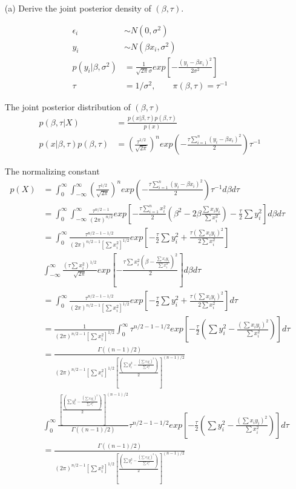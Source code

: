 \documentclass[11pt]{article} %
\begin{document}
\begin{itemize}
	\item [(a)] Derive the joint posterior density of $(\beta, \tau)$.
	
	\begin{align*}
		\epsilon_i & \sim N(0, \sigma^2) \\
		y_i & \sim N(\beta x_i, \sigma^2) \\
		p(y_i|\beta, \sigma^2) &= \frac{1}{\sqrt{2\pi} \sigma} exp[-\frac{(y_i-\beta x_i)^2}{2\sigma^2}] \\
		\tau &= 1/\sigma^2, \qquad \pi(\beta, \tau) = \tau^{-1}
	\end{align*}	
	
	The joint posterior distribution of $(\beta, \tau)$ 
\begin{align*}
	p(\beta, \tau|X) &= \frac{p(x|\beta, \tau) p(\beta, \tau)}{p(x)} \\
	p(x|\beta, \tau) p(\beta, \tau) &= (\frac{\tau^{1/2}}{\sqrt{2\pi}})^n exp(-\frac{\tau \sum_{i=1}^n (y_i-\beta x_i)^2}{2}) \tau^{-1}
\end{align*}	

	The normalizing constant
		\begin{align*}
		p(X) &= \int_{0}^{\infty} \int_{-\infty}^{\infty} (\frac{\tau^{1/2}}{\sqrt{2\pi}})^n exp(-\frac{\tau \sum_{i=1}^n (y_i-\beta x_i)^2}{2}) \tau^{-1} d\beta d\tau \\
		&=  \int_{0}^{\infty} \int_{-\infty}^{\infty} \frac{\tau^{n/2-1}}{(2\pi)^{n/2}} exp[-\frac{\tau \sum_{i=1}^n x_i^2}{2} (\beta^2 -2 \beta \frac{\sum x_i y_i}{\sum x_i^2} ) - \frac{\tau}{2} \sum y_i^2] d\beta d\tau \\
		&= \int_{0}^{\infty} \frac{\tau^{n/2-1-1/2}}{(2\pi)^{n/2-1} [\sum x_i^2]^{1/2}} exp[-\frac{\tau}{2} \sum y_i^2 + \frac{\tau (\sum x_iy_i)^2}{2 \sum x_i^2}] \\
		& \int_{-\infty}^{\infty} \frac{(\tau \sum x_i^2)^{1/2}}{\sqrt{2\pi}} exp[-\frac{\tau \sum x_i^2 (\beta - \frac{\sum x_i y_i}{\sum x_i^2})^2}{2}] d\beta d\tau \\
		&= \int_{0}^{\infty} \frac{\tau^{n/2-1-1/2}}{(2\pi)^{n/2-1} [\sum x_i^2]^{1/2}} exp[-\frac{\tau}{2} \sum y_i^2 + \frac{\tau (\sum x_iy_i)^2}{2 \sum x_i^2}] d\tau\\
		&= \frac{1}{(2\pi)^{n/2-1} [\sum x_i^2]^{1/2}} \int_{0}^{\infty} \tau^{n/2-1-1/2} exp[-\frac{\tau}{2} (\sum y_i^2 - \frac{(\sum x_iy_i)^2}{\sum x_i^2})] d\tau \\
		&=  \frac{\Gamma((n-1)/2)}{(2\pi)^{n/2-1} [\sum x_i^2]^{1/2} [\frac{(\sum y_i^2 - \frac{(\sum x_iy_i)^2}{\sum x_i^2})}{2}]^{(n-1)/2}} \\
		& \int_{0}^{\infty} \frac{[\frac{(\sum y_i^2 - \frac{(\sum x_iy_i)^2}{\sum x_i^2})}{2}]^{(n-1)/2}}{\Gamma((n-1)/2)} \tau^{n/2-1-1/2} exp[-\frac{\tau}{2} (\sum y_i^2 - \frac{(\sum x_iy_i)^2}{\sum x_i^2})] d\tau \\
		&= \frac{\Gamma((n-1)/2)}{(2\pi)^{n/2-1} [\sum x_i^2]^{1/2} [\frac{(\sum y_i^2 - \frac{(\sum x_iy_i)^2}{\sum x_i^2})}{2}]^{(n-1)/2}}
	\end{align*}	


\end{itemize}
\end{document}
